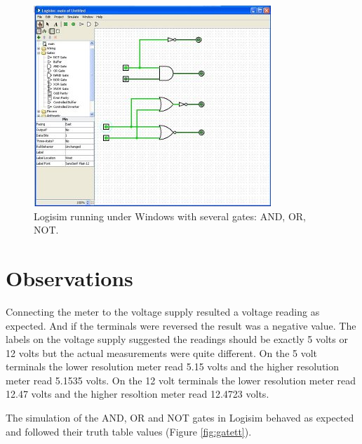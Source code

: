 \documentclass[12pt]{article}
\begin{document}
\begin{figure}[!hbtp]
\center
\includegraphics[scale=1.0]{logisim-02}
\caption{Logisim running under Windows with several gates: AND, OR, NOT.}
\label{fig:logisim}
\end{figure}

\clearpage %

\section{Observations}

Connecting the meter to the voltage supply resulted a voltage reading
as expected.
And if the terminals were reversed the result was a negative value.
The labels on the voltage supply suggested the readings should be
exactly 5 volts or 12 volts but the actual measurements were quite different.
On the 5 volt terminals the lower resolution meter read 5.15 volts and
the higher resolution meter read 5.1535 volts.
On the 12 volt terminals the lower resolution meter read 12.47 volts and
the higher resoltion meter read 12.4723 volts.

The simulation of the AND, OR and NOT gates in Logisim behaved as expected
and followed their truth table values (Figure \ref{fig:gatett}).
\end{document}

